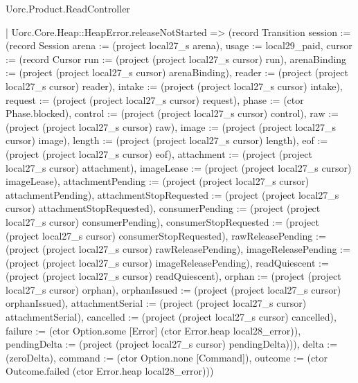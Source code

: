 \begin{lexlean}{Uorc.Product.ReadController}
\begin{semanticmodule}
{    | Uorc.Core.Heap::HeapError.releaseNotStarted => (record Transition {session := (record Session {arena := (project local27_s arena), usage := local29_paid, cursor := (record Cursor {run := (project (project local27_s cursor) run), arenaBinding := (project (project local27_s cursor) arenaBinding), reader := (project (project local27_s cursor) reader), intake := (project (project local27_s cursor) intake), request := (project (project local27_s cursor) request), phase := (ctor Phase.blocked), control := (project (project local27_s cursor) control), raw := (project (project local27_s cursor) raw), image := (project (project local27_s cursor) image), length := (project (project local27_s cursor) length), eof := (project (project local27_s cursor) eof), attachment := (project (project local27_s cursor) attachment), imageLease := (project (project local27_s cursor) imageLease), attachmentPending := (project (project local27_s cursor) attachmentPending), attachmentStopRequested := (project (project local27_s cursor) attachmentStopRequested), consumerPending := (project (project local27_s cursor) consumerPending), consumerStopRequested := (project (project local27_s cursor) consumerStopRequested), rawReleasePending := (project (project local27_s cursor) rawReleasePending), imageReleasePending := (project (project local27_s cursor) imageReleasePending), readQuiescent := (project (project local27_s cursor) readQuiescent), orphan := (project (project local27_s cursor) orphan), orphanIssued := (project (project local27_s cursor) orphanIssued), attachmentSerial := (project (project local27_s cursor) attachmentSerial), cancelled := (project (project local27_s cursor) cancelled), failure := (ctor Option.some [Error] (ctor Error.heap local28_error)), pendingDelta := (project (project local27_s cursor) pendingDelta)})}), delta := (zeroDelta), command := (ctor Option.none [Command]), outcome := (ctor Outcome.failed (ctor Error.heap local28_error))})
}
\end{semanticmodule}
\end{lexlean}
